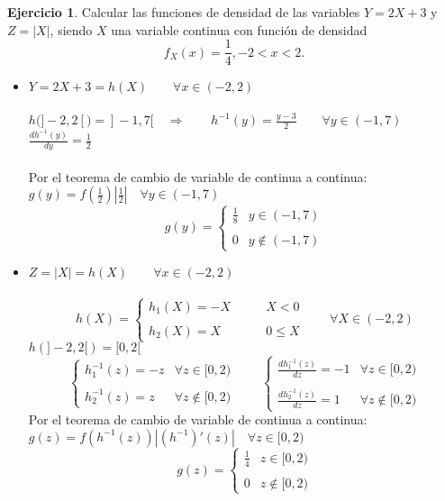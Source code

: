 \documentclass[a4paper, 12pt]{article}
\theoremstyle{definition}
\newtheorem{ej}{Ejercicio}
\begin{document}
\begin{ej}
	Calcular las funciones de densidad de las variables $Y = 2X +3$ y $Z = |X|$, siendo $X$ una
	variable continua con función de densidad
	\[f_X(x) = \frac{1}{4}, -2 < x < 2.\]
	\begin{itemize}
		\item \(Y = 2X+3 = h(X) \qquad\forall x\in (-2, 2)\) \\
		\\
		\(h(]-2,2[) = ]-1,7[\quad \Longrightarrow \qquad h^{-1}(y) = \frac{y-3}{2}\qquad\forall y\in (-1,7)\) \\
		\(\frac{dh^{-1}(y)}{dy} = \frac{1}{2}\) \\
		\\
		Por el teorema de cambio de variable de continua a continua: \\
		\(
		g(y) = f\left(\frac{1}{2}\right)\left|\frac{1}{2}\right| \quad \forall y \in (-1,7)\)
		\[
		g(y) = \left\{ \begin{array}{cc}
		\frac{1}{8}  &  y \in (-1,7)\\
		& \\
		0   & y \notin (-1,7)
		\end{array} \right.
		\]
		
		\item \(Z = |X| = h(X) \qquad\forall x\in (-2,2)\) \\
		\\
		\[h(X) = \left\{ \begin{array}{cc}
		h_1(X) = -X &\qquad X < 0 \\
		& \\
		h_2(X) = X &\qquad 0 \leq X
		\end{array} \right. \qquad \forall X\in (-2,2)\]
		\(h(]-2,2[) = [0,2[\)
		\[\left\{\begin{array}{cc}
		h_1^{-1}(z) = -z  & \forall z\in [0,2) \\
		& \\
		h_2^{-1}(z) = z  & \forall z\notin [0,2) 
		\end{array}\right. \qquad
		\left\{\begin{array}{cc}
		\frac{dh_1^{-1}(z)}{dz} = -1 &  \forall z \in [0,2)\\
		& \\
		\frac{dh_2^{-1}(z)}{dz} = 1 & \forall z \notin [0,2)
		
		\end{array} \right.\]
		Por el teorema de cambio de variable de continua a continua: \\ 
		\(g(z) = f\left(h^{-1}(z)\right)\left|\left(h^{-1}\right)'(z)\right| \quad \forall z \in [0,2)\)
		\[g(z) = \left\{\begin{array}{cc}
		\frac{1}{4} & z \in [0,2) \\
		& \\
		0 & z \notin[0,2)
		\end{array}\right.\]
	\end{itemize}
\end{ej}
\end{document}
